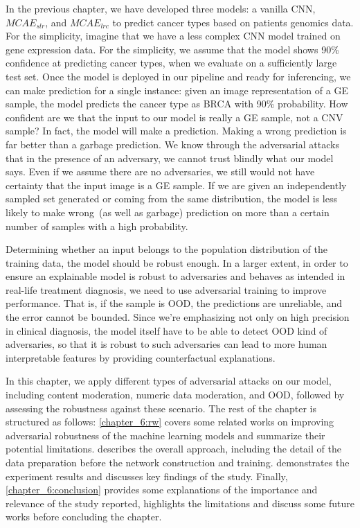 \hspace*{3.5mm} In the previous chapter, we have developed three models: a vanilla CNN, $MCAE_{slr}$, and $MCAE_{lrc}$ to predict cancer types based on patients genomics data. For the simplicity, imagine that we have a less complex CNN model trained on gene expression data. For the simplicity, we assume that the model shows 90\% confidence at predicting cancer types, when we evaluate on a sufficiently large test set. Once the model is deployed in our pipeline and ready for inferencing, we can make prediction for a single instance: given an image representation of a GE sample, the model predicts the cancer type as BRCA with 90\% probability. How confident are we that the input to our model is really a GE sample, not a CNV sample? In fact, the model will make a prediction. Making a wrong prediction is far better than a garbage prediction. We know through the adversarial attacks that in the presence of an adversary, we cannot trust blindly what our model says. Even if we assume there are no adversaries, we still would not have certainty that the input image is a GE sample. If we are given an independently sampled set generated or coming from the same distribution, the model is less likely to make wrong~(as well as garbage) prediction on more than a certain number of samples with a high probability.

\hspace*{3.5mm} Determining whether an input belongs to the population distribution of the training data, the model should be robust enough. In a larger extent, in order to ensure an explainable model is robust to adversaries and behaves as intended in real-life treatment diagnosis, we need to use adversarial training to improve performance. That is, if the sample is OOD, the predictions are unreliable, and the error cannot be bounded. Since we're emphasizing not only on high precision in clinical diagnosis, the model itself have to be able to detect OOD kind of adversaries, so that it is robust to such adversaries can lead to more human interpretable features by providing counterfactual explanations. 

\hspace*{3.5mm} In this chapter, we apply different types of adversarial attacks on our model, including  content moderation, numeric data moderation, and OOD, followed by assessing the robustness against these scenario. The rest of the chapter is structured as follows: \cref{chapter_6:rw} covers some related works on improving adversarial robustness of the machine learning models and summarize their potential limitations.  describes the overall approach, including the detail of the data preparation before the network construction and training.  demonstrates the experiment results and discusses key findings of the study. Finally, \cref{chapter_6:conclusion} provides some explanations of the importance and relevance of the study reported, highlights the limitations and discuss some future works before concluding the chapter. 


